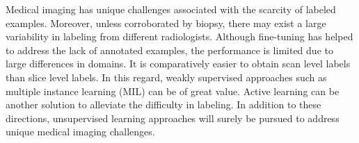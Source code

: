 \documentclass[journal]{IEEEtran}
\begin{document}
Medical imaging has unique challenges associated with the scarcity of labeled examples. Moreover, unless corroborated by biopsy, there may exist a large variability in labeling from different radiologists. Although fine-tuning has helped to address the lack of annotated
examples, the performance is limited due to large differences in domains. It is comparatively easier to obtain scan level labels than slice level labels. In this regard, weakly supervised approaches such as multiple instance learning (MIL) can be of great value. Active learning can be another solution to alleviate the difficulty in labeling. In addition to these directions, unsupervised learning approaches will surely be pursued to address unique medical imaging challenges.



\end{document}
